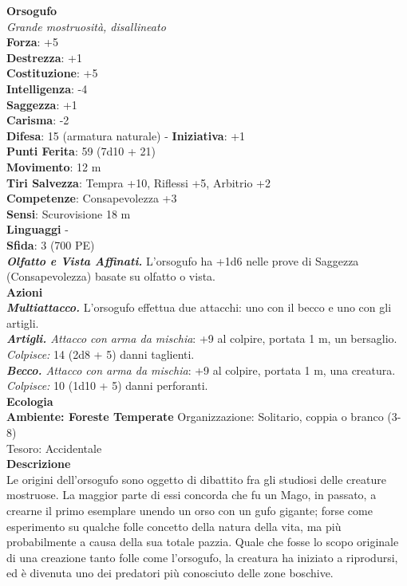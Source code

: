 \begin{multicols}{2}
\medskip\textbf{Orsogufo}\\
\emph{Grande mostruosità, disallineato}\\
\textbf{Forza}: +5\\
\textbf{Destrezza}: +1\\
\textbf{Costituzione}: +5\\
\textbf{Intelligenza}: -4\\
\textbf{Saggezza}: +1\\
\textbf{Carisma}: -2\\
\textbf{Difesa}: 15 (armatura naturale) - \textbf{Iniziativa}: +1\\
\textbf{Punti Ferita}: 59 (7d10 + 21)\\
\textbf{Movimento}: 12 m\\
\textbf{Tiri Salvezza}: Tempra +10, Riflessi +5, Arbitrio +2\\
\textbf{Competenze}: Consapevolezza +3\\
\textbf{Sensi}: Scurovisione 18 m\\
\textbf{Linguaggi} -\\
\textbf{Sfida}: 3 (700 PE)\smallskip\\
\emph{\textbf{Olfatto e Vista Affinati.}} L'orsogufo ha +1d6 nelle prove di Saggezza (Consapevolezza) basate su olfatto o vista.\\
\smallskip\textbf{Azioni}\\
\emph{\textbf{Multiattacco.}} L'orsogufo effettua due attacchi: uno con il becco e uno con gli artigli.\\
\emph{\textbf{Artigli.} Attacco con arma da mischia}: +9 al colpire, portata 1 m, un bersaglio.\\
\emph{Colpisce:} 14 (2d8 + 5) danni taglienti.\\
\emph{\textbf{Becco.} Attacco con arma da mischia}: +9 al colpire, portata 1 m, una creatura.\\
\emph{Colpisce:} 10 (1d10 + 5) danni perforanti.\\
\textbf{Ecologia}\\
\textbf{Ambiente: Foreste Temperate}
Organizzazione: Solitario, coppia o branco (3-8)\\
Tesoro: Accidentale\\
\textbf{Descrizione}\\
Le origini dell'orsogufo sono oggetto di dibattito fra gli studiosi delle creature mostruose. La maggior parte di essi concorda che fu un Mago, in passato, a crearne il primo esemplare unendo un orso con un gufo gigante; forse come esperimento su qualche folle concetto della natura della vita, ma più probabilmente a causa della sua totale pazzia. Quale che fosse lo scopo originale di una creazione tanto folle come l'orsogufo, la creatura ha iniziato a riprodursi, ed è divenuta uno dei predatori più conosciuto delle zone boschive.\\

\end{multicols}
